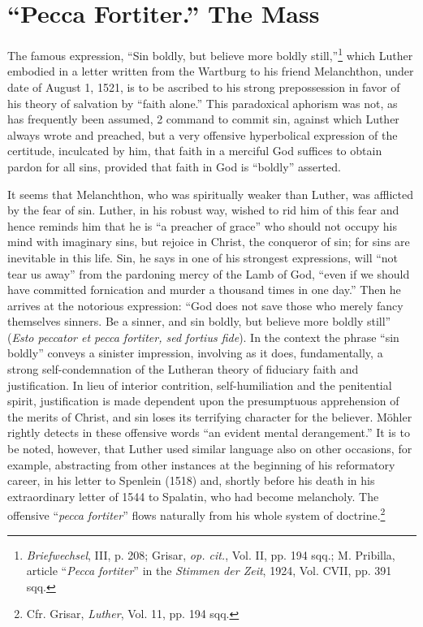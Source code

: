 \section{“Pecca Fortiter.” The Mass}

The famous expression, “Sin boldly, but believe more boldly
still,”\footnote
{\textit{Briefwechsel}, III, p. 208; Grisar, \textit{op. cit.}, Vol. II, pp. 194 sqq.; M. Pribilla, article
``\textit{Pecca fortiter}'' in the \textit{Stimmen der Zeit}, 1924, Vol. CVII, pp. 391 sqq.}
which Luther embodied in a letter written from the Wartburg to his friend
Melanchthon, under date of August 1, 1521, is to
be ascribed to his strong prepossession in favor of his theory of salvation
by “faith alone.” This paradoxical aphorism was not, as has
frequently been assumed, 2 command to commit sin, against which
Luther always wrote and preached, but a very offensive hyperbolical
expression of the certitude, inculcated by him, that faith in a merciful
God suffices to obtain pardon for all sins, provided that faith in
God is “boldly” asserted.

It seems that Melanchthon, who was spiritually weaker than Luther, was
afflicted by the fear of sin. Luther, in his robust way, wished
to rid him of this fear and hence reminds him that he is “a preacher
of grace” who should not occupy his mind with imaginary sins, but
rejoice in Christ, the conqueror of sin; for sins are inevitable in this
life. Sin, he says in one of his strongest expressions, will “not tear us
away” from the pardoning mercy of the Lamb of God, “even if we
should have committed fornication and murder a thousand times in
one day.” Then he arrives at the notorious expression: “God does not
save those who merely fancy themselves sinners. Be a sinner, and sin
boldly, but believe more boldly still” (\textit{Esto peccator et pecca fortiter,
sed fortius fide}). In the context the phrase “sin boldly” conveys
a sinister impression, involving as it does, fundamentally, a strong self-condemnation
of the Lutheran theory of fiduciary faith and justification. In lieu of
interior contrition, self-humiliation and the penitential spirit, justification
is made dependent upon the presumptuous
apprehension of the merits of Christ, and sin loses its terrifying
character for the believer. Möhler rightly detects in these offensive
words “an evident mental derangement.” It is to be noted, however,
that Luther used similar language also on other occasions, for example,
abstracting from other instances at the beginning of his reformatory
career, in his letter to Spenlein (1518) and, shortly before his death in
his extraordinary letter of 1544 to Spalatin, who had become melancholy.
The offensive “\textit{pecca fortiter}” flows naturally from his whole
system of doctrine.\footnote{Cfr. Grisar, \textit{Luther}, Vol. 11, pp. 194 sqq.}

